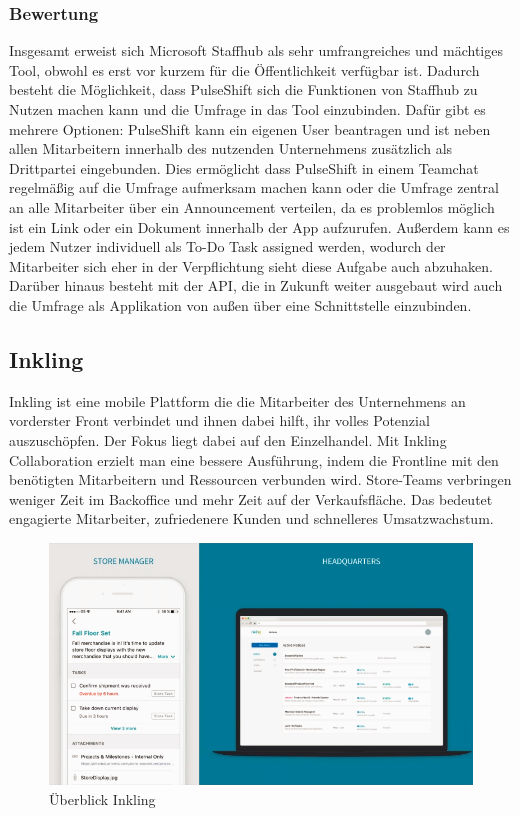 \subsubsection{Bewertung}
Insgesamt erweist sich Microsoft Staffhub als sehr umfrangreiches und mächtiges Tool, obwohl es erst vor kurzem für die Öffentlichkeit verfügbar ist. Dadurch besteht die Möglichkeit, dass PulseShift sich die Funktionen von Staffhub zu Nutzen machen kann und die Umfrage in das Tool einzubinden. Dafür gibt es mehrere Optionen: PulseShift kann ein eigenen User beantragen und ist neben allen Mitarbeitern innerhalb des nutzenden Unternehmens zusätzlich als Drittpartei eingebunden. Dies ermöglicht dass PulseShift in einem Teamchat regelmäßig auf die Umfrage aufmerksam machen kann oder die Umfrage zentral an alle Mitarbeiter über ein Announcement verteilen, da es problemlos möglich ist ein Link oder ein Dokument innerhalb der App aufzurufen. Außerdem kann es jedem Nutzer individuell als To-Do Task assigned werden, wodurch der Mitarbeiter sich eher in der Verpflichtung sieht diese Aufgabe auch abzuhaken.
Darüber hinaus besteht mit der API, die in Zukunft weiter ausgebaut wird auch die Umfrage als Applikation von außen über eine Schnittstelle einzubinden.

\subsection{Inkling}
Inkling ist eine mobile Plattform die die Mitarbeiter des Unternehmens an vorderster Front verbindet und ihnen dabei hilft, ihr volles Potenzial auszuschöpfen. Der Fokus liegt dabei auf den Einzelhandel.
\newline
Mit Inkling Collaboration erzielt man eine bessere Ausführung, indem die Frontline mit den benötigten Mitarbeitern und Ressourcen verbunden wird. Store-Teams verbringen weniger Zeit im Backoffice und mehr Zeit auf der Verkaufsfläche. Das bedeutet engagierte Mitarbeiter, zufriedenere Kunden und schnelleres Umsatzwachstum. 

\begin{figure}[H] 
\centering 
\includegraphics[scale=0.72]{images/inkgeneral} 
\caption[Überblick Inkling]{Überblick Inkling\protect} 
\label{ws} 
\end{figure}

